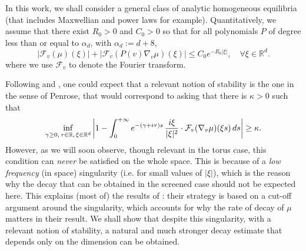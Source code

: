 \documentclass[11pt]{amsart}
\numberwithin{equation}{section}
\newcommand{\R}{\mathbb{R}}
\newcommand{\na}{\nabla}
\begin{document}
In this work, we shall consider a general class of  analytic  homogeneous equilibria (that includes Maxwellian and power laws for example). Quantitatively, we assume that there exist $R_{0}>0$ and $C_{0}>0$   so that for all polynomials $P$ of degree less than or equal to $\alpha_d$, with $\alpha_d := d+ 8$,
\begin{equation}
\label{muanal}
 |  \mathcal{F}_{v}( \mu)(\xi) | + | \mathcal{F}_{v}( P(v) \nabla_{v} \mu)(\xi) | \leq C_{0} e^{ - R_{0} | \xi |},
   \quad \forall \xi \in \mathbb{R}^d.
 \end{equation}
 where we use  $\mathcal{F}_{v}$ to denote the Fourier transform. %
 

Following \cite{MV} and \cite{BMM2}, one could  expect that a relevant notion of stability is the one  in the sense of Penrose, that would correspond to asking that there is $\kappa>0$ such that
\begin{equation}
\label{Penrose-VP}
\inf_{\gamma \geq 0, \, \tau \in \R, \,  \xi \in \R^d}  \left| 1   - \int_{0}^{+ \infty} e^{-(\gamma + i \tau)s}\, {i \xi \over  |\xi|^2}\cdot  \mathcal{F}_v( \na_v \mu)(\xi s) \, d s \right| \geq \kappa.
\end{equation}
However, as we will soon observe,  though relevant in the torus case, this condition can \emph{never} be satisfied on the whole space. This is because of a \emph{low frequency} (in space) singularity (i.e. for small values of $|\xi|$), which is the reason why the decay that can be obtained in the screened case should not be expected here.  This  explains (most of) the results of \cite{GS1,GS2}: their strategy is based on a cut-off argument around the singularity, which accounts for why the rate of decay of $\mu$ matters in their result.
We shall show that despite this singularity, with a relevant notion of stability, a natural and much stronger  decay estimate that depends only on the 
dimension can be obtained.
\end{document}
